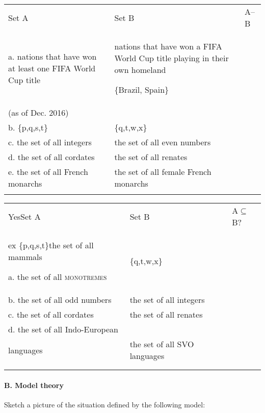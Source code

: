     \z
\ea%
    \label{ex:key:3}




        

\begin{tabularx}{\textwidth}{XXX}
\lsptoprule

 Set A & Set B & A–B\\
a. nations that have won at least one FIFA World Cup title & nations that have won a FIFA World Cup title playing in their own homeland
                       

\{Brazil, Spain\}\\
(as of Dec. 2016) & \\
b. \{p,q,s,t\} & \{q,t,w,x\} & \\
c. the set of all integers & the set of all even numbers & \\
d. the set of all cordates & the set of all renates & \\
e. the set of all French monarchs & the set of all female French monarchs & \\
\lspbottomrule
\end{tabularx}
    \z
\ea%
    \label{ex:key:4}




        

\begin{tabularx}{\textwidth}{XXX}
\lsptoprule

YesSet A & Set B & A${\subseteq}$B?\\
ex \{p,q,s,t\}the set of all mammals

a. the set of all \textsc{monotremes} & \{q,t,w,x\} & \\
b. the set of all odd numbers & the set of all integers & \\
c. the set of all cordates & the set of all renates & \\
d. the set of all Indo-European\\
    languages & the set of all SVO languages & \\
&  & \\
\lspbottomrule
\end{tabularx}
    \z
\paragraph{B. Model theory}

\ea%
    \label{ex:key:1}




         Sketch a picture of the situation defined by the following model:

